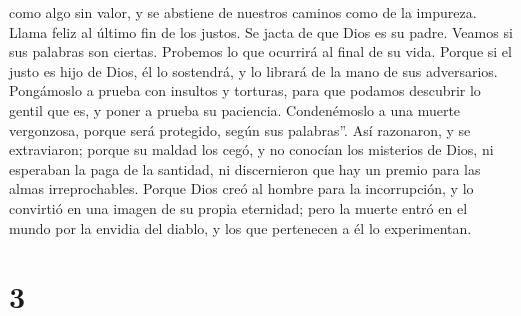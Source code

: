 como algo sin valor, y se abstiene de nuestros caminos como de la
impureza. Llama feliz al último fin de los justos. Se jacta de que Dios
es su padre.  Veamos si sus palabras son ciertas.
Probemos lo que ocurrirá al final de su vida.  Porque si
el justo es hijo de Dios, él lo sostendrá, y lo librará de la mano de
sus adversarios.  Pongámoslo a prueba con insultos y
torturas, para que podamos descubrir lo gentil que es, y poner a prueba
su paciencia.  Condenémoslo a una muerte vergonzosa,
porque será protegido, según sus palabras''.  Así
razonaron, y se extraviaron; porque su maldad los cegó, 
y no conocían los misterios de Dios, ni esperaban la paga de la
santidad, ni discernieron que hay un premio para las almas
irreprochables.  Porque Dios creó al hombre para la
incorrupción, y lo convirtió en una imagen de su propia eternidad;
 pero la muerte entró en el mundo por la envidia del
diablo, y los que pertenecen a él lo experimentan.

\hypertarget{section-2}{%
\section{3}\label{section-2}}

